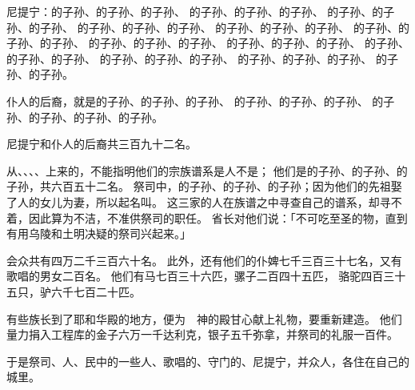 {\par }{\PP {}尼提宁：{}的子孙、{}的子孙、{}的子孙、
的子孙、{}的子孙、{}的子孙、
的子孙、{}的子孙、{}的子孙、
的子孙、{}的子孙、{}的子孙、
的子孙、{}的子孙、{}的子孙、
的子孙、{}的子孙、{}的子孙、
的子孙、{}的子孙、{}的子孙、
的子孙、{}的子孙、{}的子孙、
的子孙、{}的子孙、{}的子孙、
的子孙、{}的子孙、{}的子孙、
的子孙、{}的子孙、{}的子孙、
的子孙、{}的子孙。
\par }{\PP {}仆人的后裔，就是{}的子孙、{}的子孙、{}的子孙、
的子孙、{}的子孙、{}的子孙、
的子孙、{}的子孙、{}的子孙、{}的子孙。
\par }{\PP {}尼提宁和{}仆人的后裔共三百九十二名。
\par }{\PP {}从{}、{}、{}、{}、{}上来的，不能指明他们的宗族谱系是{}人不是；
他们是{}的子孙、{}的子孙、{}的子孙，共六百五十二名。
祭司中，{}的子孙、{}的子孙、{}的子孙；因为他们的先祖娶了{}人{}的女儿为妻，所以起名叫{}。
这三家的人在族谱之中寻查自己的谱系，却寻不着，因此算为不洁，不准供祭司的职任。
省长对他们说：「不可吃至圣的物，直到有用乌陵和土明决疑的祭司兴起来。」
\par }{\PP {}会众共有四万二千三百六十名。
此外，还有他们的仆婢七千三百三十七名，又有歌唱的男女二百名。
他们有马七百三十六匹，骡子二百四十五匹，
骆驼四百三十五只，驴六千七百二十匹。
\par }{\PP {}有些族长到了{}耶和华殿的地方，便为　神的殿甘心献上礼物，要重新建造。
他们量力捐入工程库的金子六万一千达利克，银子五千弥拿，并祭司的礼服一百件。
\par }{\PP {}于是祭司、{}人、民中的一些人、歌唱的、守门的、尼提宁，并{}众人，各住在自己的城里。

}
